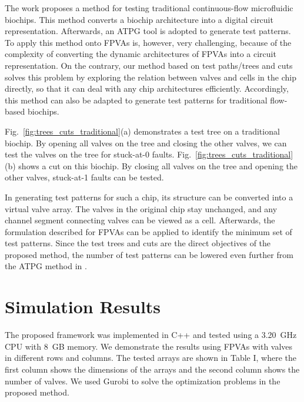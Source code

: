 \documentclass[journal,twoside]{IEEEtran}
\begin{document}
The work \cite{HuYHC14} proposes a method for testing traditional
continuous-flow microfluidic biochips. This method converts a biochip
architecture into a digital circuit representation.
Afterwards, an ATPG tool is adopted to generate test patterns. 
To apply this method onto FPVAs is, however, very challenging, because of the 
complexity of converting the dynamic architectures of FPVAs into a circuit
representation. 
On the contrary, our method based on test paths/trees and cuts
solves this problem by exploring the relation between valves and cells in
the chip directly, so that it can deal with any 
chip architectures efficiently. Accordingly, this method can also be adapted to
generate test patterns for traditional flow-based biochips.

Fig.~\ref{fig:trees_cuts_traditional}(a) demonstrates a test tree on a
traditional biochip. By opening all valves on the tree and closing the
other valves, we can test the valves on the tree for stuck-at-0 faults.
Fig.~\ref{fig:trees_cuts_traditional}(b) shows a cut on this
biochip. By closing all valves on the tree and opening the other valves, 
stuck-at-1 faults can be tested.

In generating test patterns for such a chip, its structure can be converted into
a virtual valve array. The valves in the original chip stay unchanged, and 
any channel segment connecting valves 
can be viewed as a cell. Afterwards, the formulation described for FPVAs can
be applied to identify the minimum set of test patterns. Since the test trees
and cuts are the direct objectives of the proposed method, the number of test
patterns can be lowered even further from the ATPG method in \cite{HuYHC14}.











\section{Simulation Results}\label{sec:results}

The proposed framework was implemented in C++ and tested
using a \SI[mode=text]{3.20}{\GHz} CPU with 
\SI{8}{GB} memory.
We demonstrate
the results using FPVAs with valves in different rows and columns. The
tested arrays are shown in Table I, where the first column shows
the dimensions of the arrays and the second column shows
the number of valves. 
We used Gurobi \cite{gurobi} to solve the optimization problems in the
proposed method.
\end{document}
